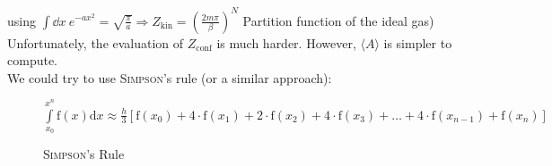 using $\int\dd x\ e^{-ax^2} = \sqrt{\frac{\pi}{a}}\Rightarrow Z_\text{kin} = \left(\frac{2m\pi}{\beta}\right)^N$ Partition function of the ideal gas)\\

Unfortunately, the evaluation of $Z_\text{conf}$ is much harder. However, $\langle A \rangle$ is simpler to compute.\\
We could try to use \textsc{Simpson}'s rule (or a similar approach):\\

\begin{figure}[!H]
\centering
{}
\caption{\textsc{Simpson}'s Rule}{$\int\limits_{x_0}^{x^n} \text{f}(x)\text{d} x\approx\frac{h}{3}\left[\text{f}(x_0) + 4\cdot\text{f}(x_1) + 2\cdot\text{f}(x_2)+4\cdot\text{f}(x_3)+\dots+4\cdot\text{f}(x_{n-1}) + \text{f}(x_n)\right]$}
\end{figure}
